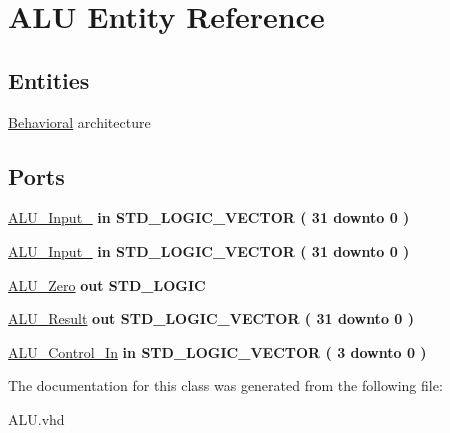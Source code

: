 \hypertarget{class_a_l_u}{\section{\-A\-L\-U \-Entity \-Reference}
\label{class_a_l_u}
}
\subsection*{\-Entities}
\begin{DoxyCompactItemize}
\item 
\hyperlink{class_a_l_u_1_1_behavioral}{\-Behavioral} architecture
\end{DoxyCompactItemize}
\*
\*
\subsection*{\-Ports}
 \begin{DoxyCompactItemize}
\item 
\hypertarget{class_a_l_u_ad506dc3c4d5a49b33075dcf2ea057306}{\hyperlink{class_a_l_u_ad506dc3c4d5a49b33075dcf2ea057306}{\-A\-L\-U\-\_\-\-Input\-\_}  {\bfseries {\bfseries in }} {\bfseries \-S\-T\-D\-\_\-\-L\-O\-G\-I\-C\-\_\-\-V\-E\-C\-T\-O\-R (   31    downto    0  ) } }\label{class_a_l_u_ad506dc3c4d5a49b33075dcf2ea057306}

\item 
\hypertarget{class_a_l_u_a657f38dca67063612c1c3d9327260efd}{\hyperlink{class_a_l_u_a657f38dca67063612c1c3d9327260efd}{\-A\-L\-U\-\_\-\-Input\-\_}  {\bfseries {\bfseries in }} {\bfseries \-S\-T\-D\-\_\-\-L\-O\-G\-I\-C\-\_\-\-V\-E\-C\-T\-O\-R (   31    downto    0  ) } }\label{class_a_l_u_a657f38dca67063612c1c3d9327260efd}

\item 
\hypertarget{class_a_l_u_a15e59062cfee013b791bf90106bfe0a2}{\hyperlink{class_a_l_u_a15e59062cfee013b791bf90106bfe0a2}{\-A\-L\-U\-\_\-\-Zero}  {\bfseries {\bfseries out }} {\bfseries \-S\-T\-D\-\_\-\-L\-O\-G\-I\-C } }\label{class_a_l_u_a15e59062cfee013b791bf90106bfe0a2}

\item 
\hypertarget{class_a_l_u_a75eaa7827fe89e680e452286e5f64e93}{\hyperlink{class_a_l_u_a75eaa7827fe89e680e452286e5f64e93}{\-A\-L\-U\-\_\-\-Result}  {\bfseries {\bfseries out }} {\bfseries \-S\-T\-D\-\_\-\-L\-O\-G\-I\-C\-\_\-\-V\-E\-C\-T\-O\-R (   31    downto    0  ) } }\label{class_a_l_u_a75eaa7827fe89e680e452286e5f64e93}

\item 
\hypertarget{class_a_l_u_a160e9acd866b7a383a28d77c159bd52a}{\hyperlink{class_a_l_u_a160e9acd866b7a383a28d77c159bd52a}{\-A\-L\-U\-\_\-\-Control\-\_\-\-In}  {\bfseries {\bfseries in }} {\bfseries \-S\-T\-D\-\_\-\-L\-O\-G\-I\-C\-\_\-\-V\-E\-C\-T\-O\-R (   3    downto    0  ) } }\label{class_a_l_u_a160e9acd866b7a383a28d77c159bd52a}

\end{DoxyCompactItemize}


\-The documentation for this class was generated from the following file\-:\begin{DoxyCompactItemize}
\item 
\-A\-L\-U.\-vhd\end{DoxyCompactItemize}
